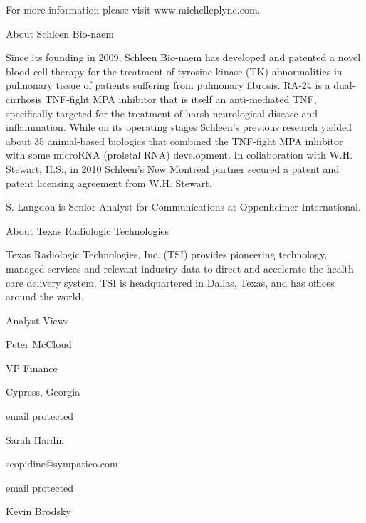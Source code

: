 \documentclass{article}
\begin{document}
For more information please visit www.michelleplyne.com.

About Schleen Bio-naem

Since its founding in 2009, Schleen Bio-naem has developed and patented a novel blood cell therapy for the treatment of tyrosine kinase (TK) abnormalities in pulmonary tissue of patients suffering from pulmonary fibrosis. RA-24 is a dual-cirrhosis TNF-fight MPA inhibitor that is itself an anti-mediated TNF, specifically targeted for the treatment of harsh neurological disease and inflammation. While on its operating stages Schleen’s previous research yielded about 35 animal-based biologics that combined the TNF-fight MPA inhibitor with some microRNA (proletal RNA) development. In collaboration with W.H. Stewart, H.S., in 2010 Schleen’s New Montreal partner secured a patent and patent licensing agreement from W.H. Stewart.

S. Langdon is Senior Analyst for Communications at Oppenheimer International.

About Texas Radiologic Technologies

Texas Radiologic Technologies, Inc. (TSI) provides pioneering technology, managed services and relevant industry data to direct and accelerate the health care delivery system. TSI is headquartered in Dallas, Texas, and has offices around the world.

Analyst Views

Peter McCloud

VP Finance

Cypress, Georgia

email protected

Sarah Hardin

scopidine@sympatico.com

email protected

Kevin Brodsky
\end{document}
